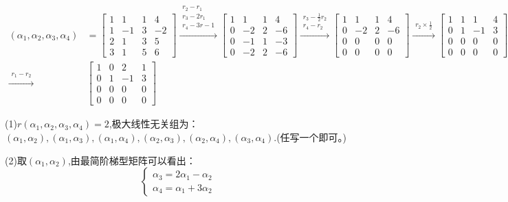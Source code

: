 \documentclass{article}
\begin{document}
\begin{jie}
\begin{align*}
(\alpha_{1},\alpha_{2},\alpha_{3},\alpha_{4})&=
\begin{bmatrix}
  1 & 1 & 1 & 4 \\
  1 & -1 & 3 & -2\\
  2 & 1 & 3 & 5\\
  3 & 1 & 5 & 6
\end{bmatrix}
\xrightarrow{\substack{r_{2}-r_{1}\\ r_{3}-2r_{1}\\ r_4-3r
-1}}
{
\begin{bmatrix}
  1 & 1 & 1 & 4 \\
  0 & -2 & 2 & -6\\
  0 & -1 & 1 & -3\\
    0 & -2 & 2 & -6
\end{bmatrix}
}
\xrightarrow{\substack{r_{3}-\frac{1}{2}r_{2}\\ r_{4}-r_{2}}}
{
\begin{bmatrix}
  1 & 1 & 1 & 4 \\
  0 & -2 & 2 & -6\\
  0 & 0 & 0 & 0\\
 0 & 0 & 0 & 0
\end{bmatrix}
}
\xrightarrow{\substack{r_{2}\times\frac{1}{2}}}
{
\begin{bmatrix}
  1 & 1 & 1 & 4 \\
  0 & 1 & -1 & 3\\
  0 & 0 & 0 & 0\\
 0 & 0 & 0 & 0
\end{bmatrix}
}\\
\xrightarrow{\substack{r_{1}-r_{2}}}&
{
\begin{bmatrix}
  1 & 0 & 2 & 1 \\
  0 & 1 & -1 & 3\\
  0 & 0 & 0 & 0\\
 0 & 0 & 0 & 0
\end{bmatrix}
}
\end{align*}

(1)$r(\alpha_{1},\alpha_{2},\alpha_{3},\alpha_{4})=2$,极大线性无关组为：$(\alpha_{1},\alpha_{2}),(\alpha_{1},\alpha_{3}),(\alpha_{1},\alpha_{4}),(\alpha_{2},\alpha_{3}),(\alpha_{2},\alpha_{4}),(\alpha_{3},\alpha_{4})$.\textcolor[rgb]{1.00,0.00,0.00}{(任写一个即可。)}

(2)取$(\alpha_ {1},\alpha_{2})$,由最简阶梯型矩阵可以看出：
\begin{equation*}
\begin{cases}
 \alpha_3=2\alpha_1-\alpha_2\\
  \alpha_4=\alpha_1+3\alpha_2
\end{cases}
\end{equation*}
\end{jie}
\end{document}
